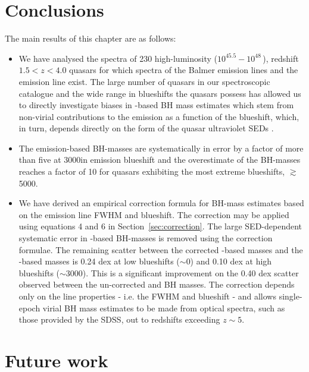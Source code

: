 \section{Conclusions}
\label{sec:conclusions}

The main results of this chapter are as follows: 

\begin{itemize}
\item We have analysed the spectra of 230 high-luminosity ($10^{45.5}-10^{48}$\,\ergs), redshift $1.5 < z < 4.0$ quasars for which spectra of the Balmer emission lines and the  emission line exist.
The large number of quasars in our spectroscopic catalogue and the wide range in  blueshifts the quasars possess has allowed us to directly investigate biases in -based BH mass estimates which stem from non-virial contributions to the  emission as a function of the  blueshift, which, in turn, depends directly on the form of the quasar ultraviolet SEDs \citep{richards11}.
\item The  emission-based BH-masses are systematically in error by a factor of more than five at 3000\kms in  emission blueshift and the overestimate of the BH-masses reaches a factor of 10 for quasars exhibiting the most extreme blueshifts, $\gtrsim$5000\kms. 
\item We have derived an empirical correction formula for BH-mass estimates based on the  emission line FWHM and blueshift.
The correction may be applied using equations 4 and 6 in Section~\ref{sec:correction}.
The large SED-dependent systematic error in -based BH-masses is removed using the correction formulae.
The remaining scatter between the corrected -based masses and the \hans-based masses is 0.24 dex at low  blueshifts ($\sim$0\kms) and 0.10 dex at high blueshifts ($\sim$3000\kms). 
This is a significant improvement on the 0.40 dex scatter observed between the un-corrected  and \ha BH masses. 
The correction depends only on the  line properties - i.e. the FWHM and blueshift - and allows single-epoch virial BH mass estimates to be made from optical spectra, such as those provided by the SDSS, out to redshifts exceeding $z\sim 5$. 
\end{itemize}

\section{Future work}

